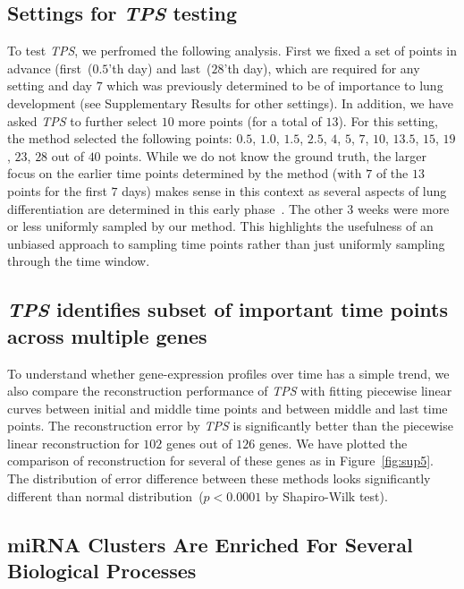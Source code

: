 \documentclass[10pt]{article}
\newcommand{\TPS}{\textit{TPS}\xspace}
\begin{document}
\subsection{Settings for \TPS testing}

To test \TPS, we perfromed the following analysis. First we fixed a set of points in advance (first~($0.5$'th day) and
last~($28$'th day), which are required for any setting and day $7$ which was
previously determined to be of importance to lung development (see
Supplementary Results for other settings). In addition, we have asked
\TPS to further select $10$ more points (for a total of $13$). For
this setting, the method selected the following points: $0.5$,
$1.0$, $1.5$, $2.5$, $4$, $5$, $7$, $10$, $13.5$, $15$, $19$, $23$,
$28$ out of $40$ points. While we do not know the ground truth, the larger focus on the
earlier time points determined by the method (with $7$ of the $13$
points for the first $7$ days) makes sense in this context as several
aspects of lung differentiation are determined in this early phase~\cite{guilliams2013}. The other $3$ weeks were more or less
uniformly sampled by our method. This highlights the usefulness of
an unbiased approach to sampling time points rather than just
uniformly sampling through the time window. 

\subsection{\TPS identifies subset of important time points across multiple genes}

To understand whether gene-expression profiles over time has a simple
trend, we also compare the reconstruction performance of \TPS
with fitting piecewise linear curves between initial and middle time points
and between middle and last time points. The reconstruction error by
\TPS is significantly better than the piecewise linear reconstruction for $102$ genes out of $126$ genes. We have plotted the
comparison of reconstruction for several of these genes as in Figure~\ref{fig:sup5}. The distribution of error difference between
these methods looks significantly different than normal distribution~($p < 0.0001$ by Shapiro-Wilk test).

\subsection{miRNA Clusters Are Enriched For Several Biological Processes}\label{sec:mirna}
\end{document}
